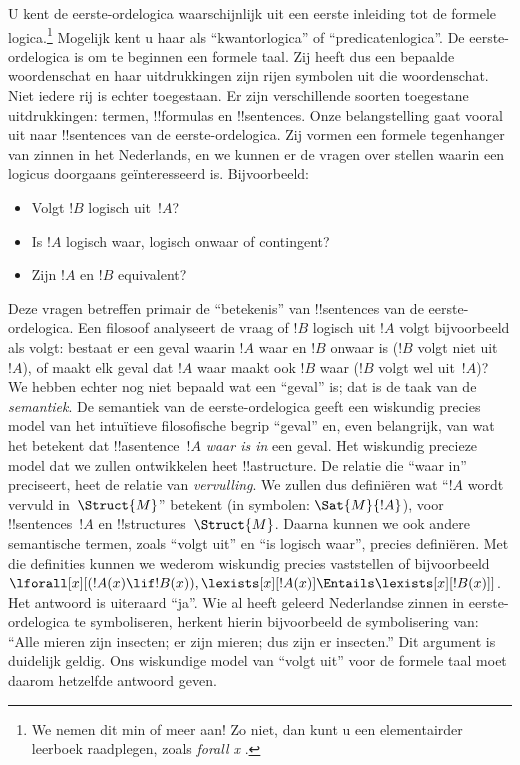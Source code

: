 \documentclass[openany]{memoir}
\begin{document}


U kent de eerste-ordelogica waarschijnlijk uit een eerste inleiding tot
de formele logica.\footnote{We nemen dit min of meer aan!{} Zo niet, dan
kunt u een elementairder leerboek raadplegen, zoals \emph{forall x}
\citep{Magnus2021}.} Mogelijk kent u haar als ``kwantorlogica'' of
``predicatenlogica''. De eerste-ordelogica is om te beginnen een formele
taal. Zij heeft dus een bepaalde woordenschat en haar uitdrukkingen zijn
rijen symbolen uit die woordenschat. Niet iedere rij is echter
toegestaan. Er zijn verschillende soorten toegestane uitdrukkingen:
termen, !!{formula}s en !!{sentence}s. Onze belangstelling gaat vooral
uit naar !!{sentence}s van de eerste-ordelogica. Zij vormen een formele
tegenhanger van zinnen in het Nederlands, en we kunnen er de vragen over
stellen waarin een logicus doorgaans geïnteresseerd is. Bijvoorbeeld:
\begin{itemize}
    \item Volgt $!B$ logisch uit~$!A$?
    \item Is $!A$ logisch waar, logisch onwaar of
contingent?
    \item Zijn $!A$ en $!B$ equivalent?
\end{itemize}

Deze vragen betreffen primair de ``betekenis'' van !!{sentence}s van de
eerste-ordelogica. Een filosoof analyseert de vraag of $!B$ logisch uit
$!A$ volgt bijvoorbeeld als volgt: bestaat er een geval waarin $!A$
waar en $!B$ onwaar is ($!B$ volgt niet uit~$!A$), of maakt elk geval
dat $!A$ waar maakt ook $!B$ waar ($!B$ volgt wel uit~$!A$)? We hebben
echter nog niet bepaald wat een ``geval'' is; dat is de taak van de
\emph{semantiek}. De semantiek van de eerste-ordelogica geeft een
wiskundig precies model van het intuïtieve filosofische begrip ``geval''
en, even belangrijk, van wat het betekent dat !!a{sentence}~$!A$
\emph{waar is in} een geval. Het wiskundig precieze model dat we zullen
ontwikkelen heet !!a{structure}. De relatie die ``waar in'' preciseert,
heet de relatie van \emph{vervulling}. We zullen dus definiëren wat
``$!A$ wordt vervuld in~$\Struct{M}$'' betekent (in symbolen:
$\Sat{M}{!A}$), voor !!{sentence}s~$!A$ en !!{structure}s~$\Struct{M}$.
Daarna kunnen we ook andere semantische termen, zoals ``volgt uit'' en
``is logisch waar'', precies definiëren. Met die definities kunnen we
wederom wiskundig precies
vaststellen of bijvoorbeeld $\lforall[x][(!A(x) \lif !B(x)),
\lexists[x][!A(x)] \Entails \lexists[x][!B(x)]]$. Het antwoord is
uiteraard ``ja''. Wie al heeft geleerd Nederlandse zinnen in
eerste-ordelogica te symboliseren, herkent hierin bijvoorbeeld de
symbolisering van: ``Alle mieren zijn insecten; er zijn mieren; dus zijn
er insecten.'' Dit argument is duidelijk geldig. Ons wiskundige model
van ``volgt uit'' voor de formele taal moet daarom hetzelfde antwoord
geven.
\end{document}
